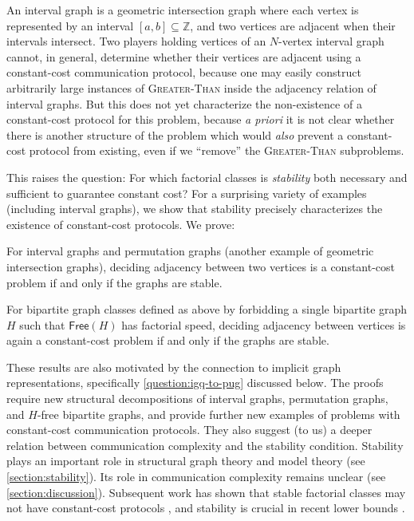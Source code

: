 \documentclass{theoretics}
\newcommand{\bZ}{\ensuremath{\mathbb{Z}}}
\newcommand{\free}{\mathsf{Free}}
\begin{document}
\begin{example}
\label{example:interval-graph}
An interval graph is a geometric intersection graph where each vertex is represented by an interval
$[a,b] \subseteq \bZ$, and two vertices are adjacent when their intervals intersect. Two players
holding vertices of an $N$-vertex interval graph cannot, in general, determine whether their
vertices are adjacent using a constant-cost communication protocol, because one may easily construct
arbitrarily large instances of \textsc{Greater-Than} inside the adjacency relation of interval
graphs.
But this does not yet characterize the non-existence of a constant-cost protocol for this
problem, because \emph{a priori} it is not clear whether there is another structure of the problem
which would \emph{also} prevent a constant-cost protocol from existing, even if we ``remove'' the
\textsc{Greater-Than} subproblems.
\end{example}

This raises the question: For which factorial classes is \emph{stability} both necessary and
sufficient to guarantee constant cost?  For a surprising variety of examples (including interval
graphs), we show that stability precisely characterizes the existence of constant-cost protocols.
We prove:
\begin{theorem}
\label{thm:intro-intersection}
For interval graphs and permutation graphs (another example of geometric intersection
graphs), deciding adjacency between two vertices is a
constant-cost problem if and only if the graphs are stable. 
\end{theorem}

\begin{theorem}
\label{thm:intro-monogenic}
For bipartite graph classes defined as above by forbidding a single bipartite graph
$H$ such that $\free(H)$ has factorial speed, deciding adjacency between vertices is again a
constant-cost problem if and only if the graphs are stable. 
\end{theorem}
These results are also motivated by the connection to implicit graph representations, specifically
\cref{question:igq-to-pug} discussed below. The proofs require new structural decompositions
of interval graphs, permutation graphs, and $H$-free bipartite graphs, and provide further new
examples of problems with constant-cost communication protocols. They also suggest (to us) a deeper
relation between communication complexity and the stability condition.  Stability plays an important
role in structural graph theory and model theory (see \cref{section:stability}). Its role in
communication complexity remains unclear (see \cref{section:discussion}). Subsequent work has shown
that stable factorial classes may not have constant-cost protocols \cite{HHH22counter,EHK22},
and stability is crucial in recent lower bounds \cite{FHHH24}.
\end{document}
